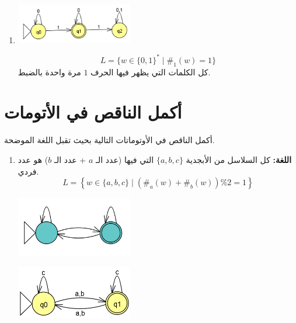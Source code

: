 \documentclass[12pt]{article}
\begin{document}
\begin{enumerate}[itemsep=3em]
\begin{enumerate}
\item
\includegraphics[width=0.4\textwidth]{../../../images/DFAs/ex1_q13.png}
\ifwithsols
\begin{solution}
\[ L = \{ w \in \{0, 1\}^* \mid \#_1(w) = 1 \} \]
كل الكلمات التي يظهر فيها الحرف $1$ مرة واحدة بالضبط.
\end{solution}
\fi

\end{enumerate}

\clearpage
\section{أكمل الناقص في الأتومات}
أكمل الناقص في الأوتوماتات التالية بحيث تقبل اللغة الموضحة.

\ifwithsols
\begin{enumerate}[itemsep=3em]
\else
\begin{enumerate}
\fi

\item
\textbf{اللغة:} كل السلاسل من الأبجدية $\{a, b, c\}$ التي فيها (عدد الـ $a$ + عدد الـ $b$) هو عدد فردي.
\[ L = \left\{ w \in \{a, b, c\} \mid (\#_a(w) + \#_b(w)) \% 2 = 1 \right\} \]
\begin{center}
\includegraphics[width=0.4\textwidth]{../../../images/DFAs/ex1_p2_q1.png}
\end{center}
\ifwithsols
\begin{solution}
    \begin{center}
        \includegraphics[width=0.4\textwidth]{../../../images/DFAs/ex1_p2_q1_sol.png}
    \end{center}
\end{solution}
\fi


\end{enumerate}
\end{enumerate}
\end{enumerate}
\end{document}
